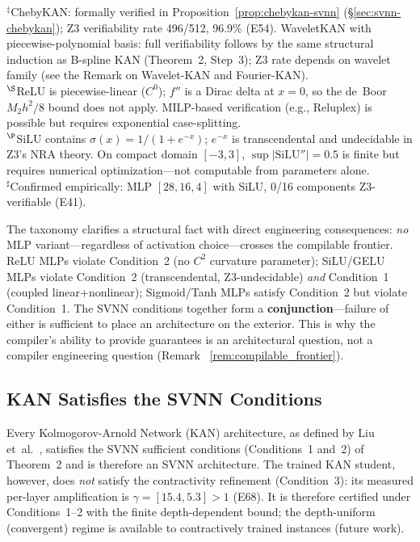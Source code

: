 \begin{table}[t]
{$^{\ddag}$ChebyKAN: formally verified in Proposition~\ref{prop:chebykan-svnn} ({\S}\ref{sec:svnn-chebykan}); Z3 verifiability rate 496/512, 96.9\% (E54). WaveletKAN with piecewise-polynomial basis: full verifiability follows by the same structural induction as B-spline KAN (Theorem~2, Step~3); Z3 rate depends on wavelet family (see the Remark on Wavelet-KAN and Fourier-KAN).\\
$^{\S}$ReLU is piecewise-linear ($C^0$); $f''$ is a Dirac delta at $x=0$, so the de~Boor $M_2 h^2/8$ bound does not apply. MILP-based verification (e.g., Reluplex) is possible but requires exponential case-splitting.\\
$^{\P}$SiLU contains $\sigma(x)=1/(1+e^{-x})$; $e^{-x}$ is transcendental and undecidable in Z3's NRA theory. On compact domain $[-3,3]$, $\sup|\text{SiLU}''| = 0.5$ is finite but requires numerical optimization---not computable from parameters alone.\\
$^{\sharp}$Confirmed empirically: MLP $[28,16,4]$ with SiLU, 0/16 components Z3-verifiable (E41).}
\end{table}

The taxonomy clarifies a structural fact with direct engineering consequences:
\textit{no} MLP variant---regardless of activation choice---crosses the
compilable frontier. ReLU MLPs violate Condition~2 (no $C^2$ curvature
parameter); SiLU/GELU MLPs violate Condition~2 (transcendental, Z3-undecidable)
\textit{and} Condition~1 (coupled linear+nonlinear); Sigmoid/Tanh MLPs satisfy
Condition~2 but violate Condition~1. The SVNN conditions together form a
\textbf{conjunction}---failure of either is sufficient to place an architecture
on the exterior. This is why the compiler's ability to provide guarantees is an
architectural question, not a compiler engineering question (Remark~%
\ref{rem:compilable_frontier}).

\subsection{KAN Satisfies the SVNN Conditions}
\label{sec:svnn-kan}

\begin{proposition}
\label{prop:kan-svnn}
Every Kolmogorov-Arnold Network (KAN) architecture, as defined by
Liu et~al.~\cite{liu2024kan}, satisfies the SVNN sufficient conditions
(Conditions~1 and~2) of Theorem~2 and is therefore an SVNN architecture.
The trained KAN student, however, does \emph{not} satisfy the contractivity
refinement (Condition~3): its measured per-layer amplification is
$\gamma = [15.4, 5.3] > 1$ (E68). It is therefore certified under
Conditions~1--2 with the finite depth-dependent bound; the depth-uniform
(convergent) regime is available to contractively trained instances
(future work).
\end{proposition}

